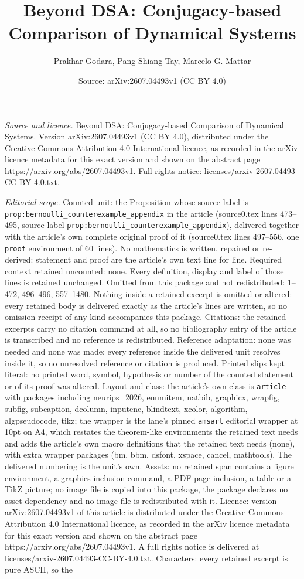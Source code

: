 \documentclass[10pt,a4paper]{amsart}
\title[Beyond DSA: Conjugacy-based Comparison of Dynamical Systems]{Beyond DSA: Conjugacy-based Comparison of Dynamical Systems}
\author{Prakhar Godara, Pang Shiang Tay, Marcelo G. Mattar}
\date{Source: arXiv:2607.04493v1 (CC BY 4.0)}
\begin{document}
\maketitle

\noindent\emph{Source and licence.} Beyond DSA: Conjugacy-based Comparison of Dynamical Systems. Version arXiv:2607.04493v1 (CC BY 4.0), distributed under the Creative Commons Attribution 4.0 International licence, as recorded in the arXiv licence metadata for this exact version and shown on the abstract page https://arxiv.org/abs/2607.04493v1. Full rights notice: licenses/arxiv-2607.04493-CC-BY-4.0.txt.\par\smallskip

\noindent\textit{Editorial scope.} Counted unit: the Proposition whose source label is \texttt{prop:bernoulli\_counterexample\_appendix} in the article (source0.tex lines 473--495, source label \texttt{prop:bernoulli\_counterexample\_appendix}), delivered together with the article's own complete original proof of it (source0.tex lines 497--556, one \texttt{proof} environment of 60 lines). No mathematics is written, repaired or re-derived: statement and proof are the article's own text line for line. Required context retained uncounted: none. Every definition, display and label of those lines is retained unchanged. Omitted from this package and not redistributed: 1--472, 496--496, 557--1480. Nothing inside a retained excerpt is omitted or altered: every retained body is delivered exactly as the article's lines are written, so no omission receipt of any kind accompanies this package. Citations: the retained excerpts carry no citation command at all, so no bibliography entry of the article is transcribed and no reference is redistributed. Reference adaptation: none was needed and none was made; every reference inside the delivered unit resolves inside it, so no unresolved reference or citation is produced. Printed slips kept literal: no printed word, symbol, hypothesis or number of the counted statement or of its proof was altered. Layout and class: the article's own class is \texttt{article} with packages including neurips\_2026, enumitem, natbib, graphicx, wrapfig, subfig, subcaption, dcolumn, inputenc, blindtext, xcolor, algorithm, algpseudocode, tikz; the wrapper is the lane's pinned \texttt{amsart} editorial wrapper at 10pt on A4, which restates the theorem-like environments the retained text needs and adds the article's own macro definitions that the retained text needs (none), with extra wrapper packages (bm, bbm, dsfont, xspace, cancel, mathtools). The delivered numbering is the unit's own. Assets: no retained span contains a figure environment, a graphics-inclusion command, a PDF-page inclusion, a table or a TikZ picture; no image file is copied into this package, the package declares no asset dependency and no image file is redistributed with it. Licence: version arXiv:2607.04493v1 of this article is distributed under the Creative Commons Attribution 4.0 International licence, as recorded in the arXiv licence metadata for this exact version and shown on the abstract page https://arxiv.org/abs/2607.04493v1. A full rights notice is delivered at licenses/arxiv-2607.04493-CC-BY-4.0.txt. Characters: every retained excerpt is pure ASCII, so the 
\end{document}
